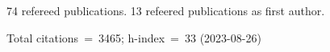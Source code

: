 74 refereed publications. 13 refeered publications as first author.

Total citations~=~3465; h-index~=~33 (2023-08-26)